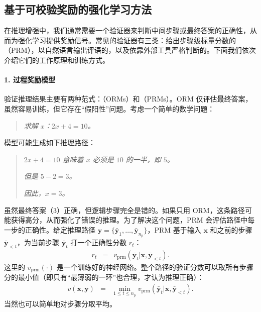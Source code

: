 \subsection{基于可校验奖励的强化学习方法}
\label{sec:reasoning-verification}

在推理增强中，我们通常需要一个验证器来判断中间步骤或最终答案的正确性，从而为强化学习提供奖励信号。常见的验证器有三类：给出步骤级标量分数的（PRM），以自然语言输出评语的，以及依靠外部工具严格判断的。下面我们依次介绍它们的工作原理和训练方式。

\paragraph{1. 过程奖励模型}

验证推理结果主要有两种范式：（ORMs）和（PRMs）\cite{uesato-etal:2022solving,lightman-etal:2024lets}。ORM 仅评估最终答案，虽然容易训练，但它存在“假阳性”问题。考虑一个简单的数学问题：

\vspace{0.5em}
\begin{quote}
\textit{求解 $x$：$2x + 4 = 10$。}
\end{quote}
\vspace{0.5em}

模型可能生成如下推理路径：
\vspace{0.5em}
\begin{quote}
\textit{$2x + 4 = 10$ 意味着 $x$ 必须是 $10$ 的一半，即 $5$。}

\textit{但是 $5 - 2 = 3$。}

\textit{因此，$x = 3$。}
\end{quote}
\vspace{0.5em}

虽然最终答案（$3$）正确，但逻辑步骤完全是错的。如果只用 ORM，这条路径可能获得高分，从而强化了错误的推理。为了解决这个问题，PRM 会评估路径中每一步的正确性。给定推理路径 $\mathbf{y} = \{\bar{\mathbf{y}}_1, \dots, \bar{\mathbf{y}}_{n_p}\}$，PRM 基于输入 $\mathbf{x}$ 和之前的步骤 $\bar{\mathbf{y}}_{<t}$，为当前步骤 $\bar{\mathbf{y}}_t$ 打一个正确性分数 $r_t$：
\begin{eqnarray}
r_t & = & v_{\mathrm{prm}}(\bar{\mathbf{y}}_t | \mathbf{x}, \bar{\mathbf{y}}_{<t}).
\end{eqnarray}
这里的 $v_{\mathrm{prm}}(\cdot)$ 是一个训练好的神经网络。整个路径的验证分数可以取所有步骤分的最小值（即只有“最薄弱的一环”也合理，才认为推理正确）：
\begin{eqnarray}
v(\mathbf{x}, \mathbf{y}) & = & \min_{1 \le t \le n_p} v_{\mathrm{prm}}(\bar{\mathbf{y}}_t | \mathbf{x}, \bar{\mathbf{y}}_{<t}).
\end{eqnarray}
当然也可以简单地对步骤分取平均。

